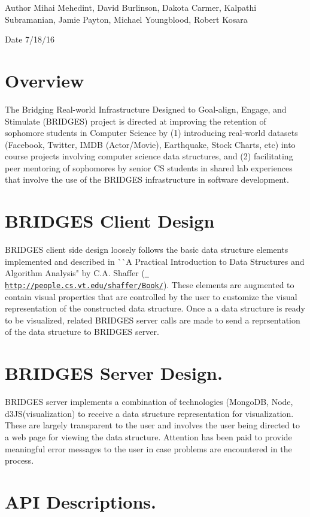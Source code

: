 \begin{DoxyAuthor}{Author}
Mihai Mehedint, David Burlinson, Dakota Carmer, Kalpathi Subramanian, Jamie Payton, Michael Youngblood, Robert Kosara 
\end{DoxyAuthor}
\begin{DoxyDate}{Date}
7/18/16
\end{DoxyDate}
\hypertarget{index_overview_sec}{}\section{Overview}\label{index_overview_sec}
The Bridging Real-\/world Infrastructure Designed to Goal-\/align, Engage, and Stimulate (B\+R\+I\+D\+G\+ES) project is directed at improving the retention of sophomore students in Computer Science by (1) introducing real-\/world datasets (Facebook, Twitter, I\+M\+DB (Actor/\+Movie), Earthquake, Stock Charts, etc) into course projects involving computer science data structures, and (2) facilitating peer mentoring of sophomores by senior CS students in shared lab experiences that involve the use of the B\+R\+I\+D\+G\+ES infrastructure in software development. \hypertarget{index_br_client}{}\section{B\+R\+I\+D\+G\+E\+S Client Design}\label{index_br_client}
B\+R\+I\+D\+G\+ES client side design loosely follows the basic data structure elements implemented and described in \`{}\`{}A Practical Introduction to Data Structures and Algorithm Analysis" by C.\+A. Shaffer (\href{http://people.cs.vt.edu/shaffer/Book/}{\texttt{ http\+://people.\+cs.\+vt.\+edu/shaffer/\+Book/}}). These elements are augmented to contain visual properties that are controlled by the user to customize the visual representation of the constructed data structure. Once a a data structure is ready to be visualized, related B\+R\+I\+D\+G\+ES server calls are made to send a reprsentation of the data structure to B\+R\+I\+D\+G\+ES server. \hypertarget{index_br_server}{}\section{B\+R\+I\+D\+G\+E\+S Server Design.}\label{index_br_server}
B\+R\+I\+D\+G\+ES server implements a combination of technologies (Mongo\+DB, Node, d3\+J\+S(visualization) to receive a data structure representation for visualization. These are largely transparent to the user and involves the user being directed to a web page for viewing the data structure. Attention has been paid to provide meaningful error messages to the user in case problems are encountered in the process. \hypertarget{index_api_sec}{}\section{A\+P\+I Descriptions.}\label{index_api_sec}
